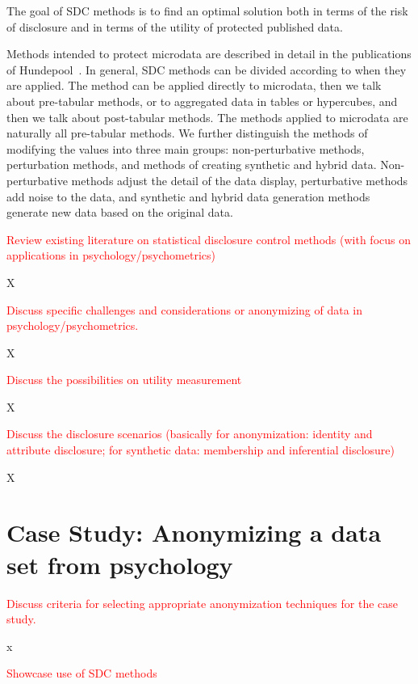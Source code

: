 \documentclass{article}
\begin{document}
The goal of SDC methods is to find an optimal solution both in terms of the risk of disclosure and in terms of the utility of protected published data.

Methods intended to protect microdata are described in detail in the publications of Hundepool~\cite{2012_Hundepool}. In general, SDC methods can be divided according to when they are applied. The method can be applied directly to microdata, then we talk about pre-tabular methods, or to aggregated data in tables or hypercubes, and then we talk about post-tabular methods. The methods applied to microdata are naturally all pre-tabular methods.
We further distinguish the methods of modifying the values into three main groups: non-perturbative methods, perturbation methods, and methods of creating synthetic and hybrid data. Non-perturbative methods adjust the detail of the data display, perturbative methods add noise to the data, and synthetic and hybrid data generation methods generate new data based on the original data. 
\newline

\textcolor{red}{Review existing literature on statistical disclosure control methods (with focus on applications in psychology/psychometrics)}

X

\textcolor{red}{Discuss specific challenges and considerations or anonymizing of data in psychology/psychometrics.}

X

\textcolor{red}{Discuss the possibilities on utility measurement}

X

\textcolor{red}{Discuss the disclosure scenarios (basically for anonymization: identity and attribute disclosure; for synthetic data: membership and inferential disclosure)}

X

\section{Case Study: Anonymizing a data set from psychology}

\textcolor{red}{Discuss criteria for selecting appropriate anonymization techniques for the case study.}

x

\textcolor{red}{Showcase use of SDC methods}
\end{document}
